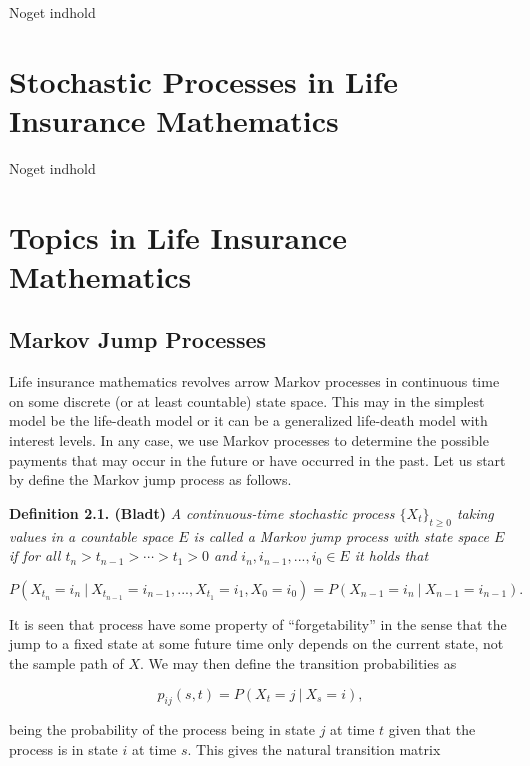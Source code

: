 \documentclass[
]{book}
\begin{document}
Noget indhold

\hypertarget{stochastic-processes-in-life-insurance-mathematics}{%
\chapter{Stochastic Processes in Life Insurance Mathematics}\label{stochastic-processes-in-life-insurance-mathematics}}

Noget indhold

\hypertarget{topics-in-life-insurance-mathematics}{%
\chapter{Topics in Life Insurance Mathematics}\label{topics-in-life-insurance-mathematics}}

\hypertarget{markov-jump-processes}{%
\section{Markov Jump Processes}\label{markov-jump-processes}}

Life insurance mathematics revolves arrow Markov processes in continuous time on some discrete (or at least countable) state space. This may in the simplest model be the life-death model or it can be a generalized life-death model with interest levels. In any case, we use Markov processes to determine the possible payments that may occur in the future or have occurred in the past. Let us start by define the Markov jump process as follows.

\textbf{Definition 2.1. (Bladt)} \emph{A continuous-time stochastic process \(\{X_t\}_{t\ge 0}\) taking values in a countable space \(E\) is called a Markov jump process with state space \(E\) if for all \(t_n>t_{n-1}>\cdots > t_1>0\) and \(i_n,i_{n-1},...,i_0\in E\) it holds that}

\[
P(X_{t_n}=i_n \ \vert\ X_{t_{n-1}}=i_{n-1},...,X_{t_1}=i_1,X_0=i_0)=P(X_{n-1}=i_n\ \vert\ X_{n-1}=i_{n-1}).
\]

It is seen that process have some property of ``forgetability'' in the sense that the jump to a fixed state at some future time only depends on the current state, not the sample path of \(X\). We may then define the transition probabilities as

\[
p_{ij}(s,t)=P(X_t=j\ \vert\ X_s=i),
\]

being the probability of the process being in state \(j\) at time \(t\) given that the process is in state \(i\) at time \(s\). This gives the natural transition matrix
\end{document}
